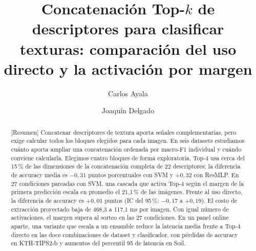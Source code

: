 \documentclass[a4paper,fleqn]{cas-sc}
\begin{document}
\let\WriteBookmarks\relax
\def\floatpagepagefraction{1}
\def\textpagefraction{.001}


\title[mode=title]{Concatenación \texorpdfstring{Top-$k$}{Top-k} de descriptores para clasificar texturas: comparación del uso directo y la activación por margen}

\tnotemark[1]

\author[1]{Carlos Ayala}
\cormark[1]
\fnmark[1]


\author[1]{Joaquín Delgado}
\fnmark[1]


\begin{abstract}[Resumen]
Concatenar descriptores de textura aporta señales complementarias, pero exige calcular todos los bloques elegidos para cada imagen. En seis datasets estudiamos cuánto aporta ampliar una concatenación ordenada por macro-F1 individual y cuándo conviene calcularla. Elegimos cuatro bloques de forma exploratoria. Top-4 usa cerca del 15\,\% de las dimensiones de la concatenación completa de 22 descriptores; la diferencia de accuracy media es $-0{,}31$ puntos porcentuales con SVM y $+0{,}32$ con ResMLP. En 27 condiciones pareadas con SVM, una cascada que activa Top-4 según el margen de la primera predicción escala en promedio el 21,1\,\% de las imágenes. Frente al uso directo, la diferencia de accuracy es $+0{,}01$ puntos (IC del 95\,\%: $-0{,}17$ a $+0{,}19$). El costo de extracción proyectado baja de 468,3 a 117,1 ms por imagen. Con igual número de activaciones, el margen supera al sorteo en las 27 condiciones. En un panel online aparte, una variante que escala a un ensamble reduce la latencia media frente a Top-4 directo en las doce combinaciones de dataset y clasificador, con pérdidas de accuracy en KTH-TIPS2-b y aumentos del percentil 95 de latencia en Soil.
\end{abstract}
\end{document}
